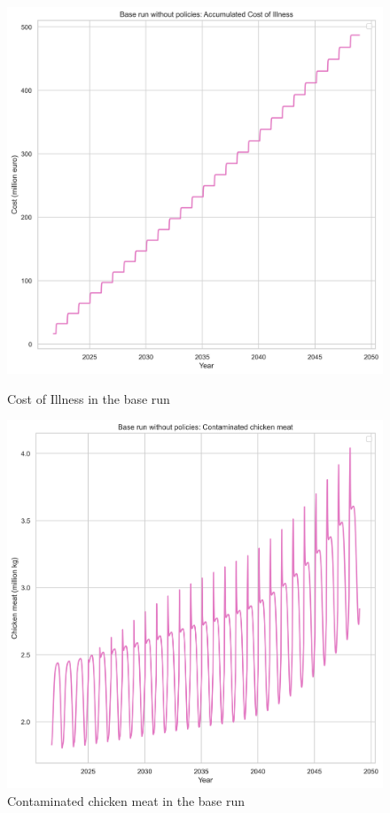 \begin{figure}[h!]
    \centering
    \begin{minipage}{0.45\textwidth}
        \centering
        \includegraphics[width=1\textwidth]{images/br_acoi.png} %
        \caption{Cost of Illness in the base run}
        \label{fig:b_coi}
    \end{minipage}\hfill
    \begin{minipage}{0.45\textwidth}
        \centering
        \includegraphics[width=1\textwidth]{images/br_meat.png} %
        \caption{Contaminated chicken meat in the base run}
        \label{fig:b_meat}
    \end{minipage}
\end{figure}

